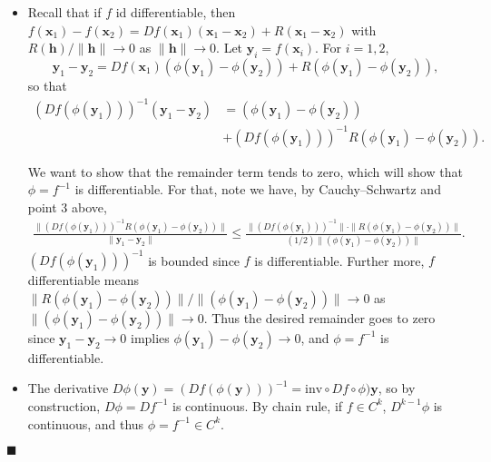 \documentclass[letter-paper]{tufte-book}
\newenvironment{proof}[1][Proof]{\begin{trivlist}
\item[\hskip \labelsep {\bfseries #1}]}{\end{trivlist}}
\newcommand{\qed}{\hfill$\blacksquare$}
\begin{document}
\begin{proof}
\begin{itemize}
    \item Recall that if $f$ id differentiable, then $f(\boldsymbol{x}_1) -
    f(\boldsymbol{x}_2) = Df(\boldsymbol{x}_1)(\boldsymbol{x}_1 -
    \boldsymbol{x}_2) + R(\boldsymbol{x}_1 - \boldsymbol{x}_2)$ with
    $R(\boldsymbol{h}) / \|\boldsymbol{h}\| \to 0$ as $\|\boldsymbol{h}\| \to
    0$. Let $\boldsymbol{y}_i = f(\boldsymbol{x}_i)$. For $i=1,2$,
    \begin{equation*}
      \boldsymbol{y}_1 - \boldsymbol{y}_2 = Df(\boldsymbol{x}_1)\left(\phi(\boldsymbol{y}_1) - \phi(\boldsymbol{y}_2)\right) + R\left(\phi(\boldsymbol{y}_1) - \phi(\boldsymbol{y}_2)\right),
    \end{equation*}
    so that
    \begin{align*}
      \left(Df(\phi(\boldsymbol{y}_1))\right)^{-1}(\boldsymbol{y}_1 - \boldsymbol{y}_2) &= \left(\phi(\boldsymbol{y}_1) - \phi(\boldsymbol{y}_2)\right) \\
        &+\left(Df(\phi(\boldsymbol{y}_1))\right)^{-1}R\left(\phi(\boldsymbol{y}_1) - \phi(\boldsymbol{y}_2)\right).
    \end{align*}
    
    We want to show that the remainder term tends to zero, which will show that
    $\phi = f^{-1}$ is differentiable. For that, note we have, by
    Cauchy--Schwartz and point 3 above,
    \begin{align*}
      \frac{\|\left(Df(\phi(\boldsymbol{y}_1))\right)^{-1}R\left(\phi(\boldsymbol{y}_1) - \phi(\boldsymbol{y}_2)\right)\|}{\|\boldsymbol{y}_1 - \boldsymbol{y}_2\|} \leq  \frac{\|\left(Df(\phi(\boldsymbol{y}_1))\right)^{-1}\|\cdot \|R\left(\phi(\boldsymbol{y}_1) - \phi(\boldsymbol{y}_2)\right)\|}{(1/2)\|\left(\phi(\boldsymbol{y}_1) - \phi(\boldsymbol{y}_2)\right)\|}.
    \end{align*}
    $\left(Df(\phi(\boldsymbol{y}_1))\right)^{-1}$ is bounded since $f$ is
    differentiable. Further more, $f$ differentiable means
    $\|R\left(\phi(\boldsymbol{y}_1) - \phi(\boldsymbol{y}_2)\right)\| /
    \|\left(\phi(\boldsymbol{y}_1) - \phi(\boldsymbol{y}_2)\right)\| \to 0$ as
    $\|\left(\phi(\boldsymbol{y}_1) - \phi(\boldsymbol{y}_2)\right)\| \to 0$.
    Thus the desired remainder goes to zero since $\boldsymbol{y}_1 -
    \boldsymbol{y}_2 \to 0$ implies $\phi(\boldsymbol{y}_1) -
    \phi(\boldsymbol{y}_2) \to 0$, and $\phi = f^{-1}$ is differentiable.
    
    \item The derivative $D\phi(\boldsymbol{y}) =
    (Df(\phi(\boldsymbol{y})))^{-1} = \mbox{inv} \circ Df \circ
    \phi)\boldsymbol{y}$, so by construction, $D\phi = Df^{-1}$ is continuous.
    By chain rule, if $f\in C^k$, $D^{k-1}\phi$ is continuous, and thus $\phi =
    f^{-1} \in C^k$.
  \end{itemize}
  
   \qed
\end{proof}
\end{document}

